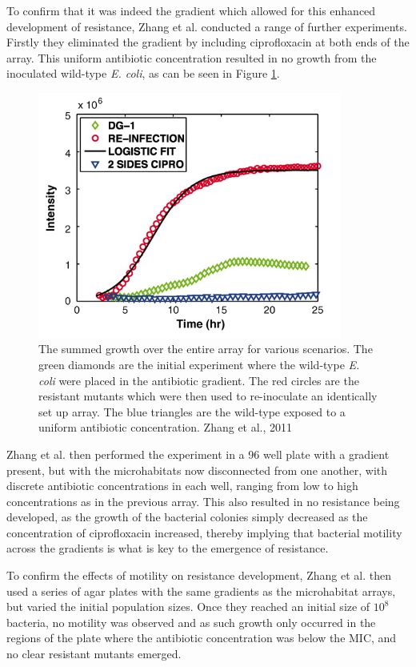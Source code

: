 \documentclass[a4paper,12pt]{article}
\begin{document}
To confirm that it was indeed the gradient which allowed for this enhanced development of resistance, Zhang et al. conducted a range of further experiments.
Firstly they eliminated the gradient by including ciprofloxacin at both ends of the array.  This uniform antibiotic concentration resulted in no growth
from the inoculated wild-type \textit{E. coli}, as can be seen in Figure \ref{fig:Zhang-gradient-growth-graph}.

\begin{figure}[H]
 \centering
 \includegraphics[width=10cm]{Zhang-microhab-gradient-growth-graph}
 \caption{The summed growth over the entire array for various scenarios.  The green diamonds are the initial experiment where the wild-type \textit{E. coli}
 were placed in the antibiotic gradient.  The red circles are the resistant mutants which were then used to re-inoculate an identically set up array.
 The blue triangles are the wild-type exposed to a uniform antibiotic concentration.  Zhang et al., 2011}
 \label{fig:Zhang-gradient-growth-graph}
\end{figure}


Zhang et al. then performed the experiment in a 96 well plate with a gradient present, but with the microhabitats now disconnected from one another, with discrete 
antibiotic concentrations in each well, ranging from low to high concentrations as in the previous array.  This also resulted in no resistance being developed,
as the growth of the bacterial colonies simply decreased as the concentration of ciprofloxacin increased, thereby implying that bacterial motility across the 
gradients is what is key to the emergence of resistance.  

To confirm the effects of motility on resistance development, Zhang et al. then used a series of agar plates with the same gradients as the microhabitat arrays,
but varied the initial population sizes.  Once they reached an initial size of $10^8$ bacteria, no motility was observed and as such growth only occurred in 
the regions of the plate where the antibiotic concentration was below the MIC, and no clear resistant mutants emerged.
\end{document}
